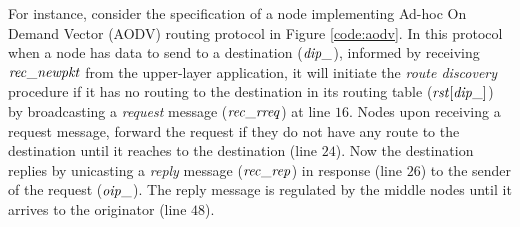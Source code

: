 For instance, consider the specification of a node implementing Ad-hoc On Demand Vector (AODV) routing protocol \cite{AODV} in Figure \ref{code:aodv}. In this protocol when a node has data to send to a destination (${\it dip\_}$), informed by receiving ${\it rec\_newpkt}$ from the upper-layer application, it will initiate the \emph{route discovery} procedure if it has no routing to the destination in its routing table (${\it rst}[{\it dip\_}]$) by broadcasting a \emph{request} message (${\it rec\_rreq}$) at line $16$. Nodes upon receiving a request message, forward the request if they do not have any route to the destination until it reaches to the destination (line $24$). Now the destination replies by unicasting a \emph{reply} message (${\it rec\_rep}$) in response (line $26$) to the sender of the request (${\it oip\_}$). The reply message is regulated by the middle nodes until it arrives to the originator (line $48$).

\begin{figure*}
	\begin{center}
		
	\end{center}
	\caption{The AODV protocol specified by wRebeca \label{code:aodv}\cite{FOAC}}
\end{figure*} 

